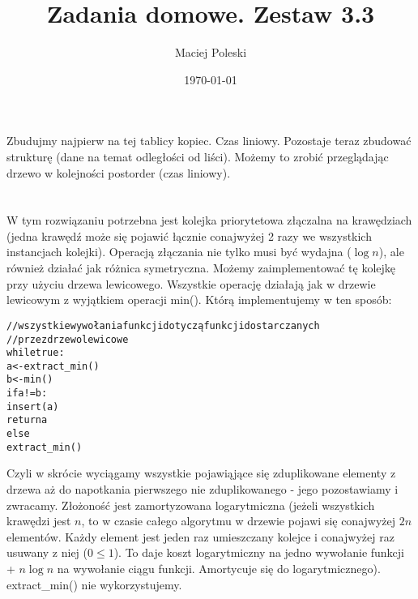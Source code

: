 \documentclass[a4paper,12pt]{article}
\title{Zadania domowe. Zestaw 3.3}
\author{Maciej Poleski}
\date{\today}
\begin{document}
\maketitle

\newpage

\section{}
Zbudujmy najpierw na tej tablicy kopiec. Czas liniowy. Pozostaje teraz zbudować strukturę (dane na temat odległości od liści). Możemy to zrobić przeglądając drzewo w kolejności postorder (czas liniowy).

\section{}
W tym rozwiązaniu potrzebna jest kolejka priorytetowa złączalna na krawędziach (jedna krawędź może się pojawić łącznie conajwyżej 2 razy we wszystkich instancjach kolejki). Operacją złączania nie tylko musi być wydajna ($\log{n}$), ale również działać jak różnica symetryczna. Możemy zaimplementować tę kolejkę przy użyciu drzewa lewicowego. Wszystkie operację działają jak w drzewie lewicowym z wyjątkiem operacji min(). Którą implementujemy w ten sposób:
\begin{alltt}
 // wszystkie wywołania funkcji dotyczą funkcji dostarczanych
 // przez drzewo lewicowe
 while true:
  a <- extract_min()
  b <- min()
  if a != b:
    insert(a)
    return a
  else
    extract_min()
\end{alltt}
Czyli w skrócie wyciągamy wszystkie pojawiąjące się zduplikowane elementy z drzewa aż do napotkania pierwszego nie zduplikowanego - jego pozostawiamy i zwracamy. Złożoność jest zamortyzowana logarytmiczna (jeżeli wszystkich krawędzi jest $n$, to w czasie całego algorytmu w drzewie pojawi się conajwyżej $2n$ elementów. Każdy element jest jeden raz umieszczany kolejce i conajwyżej raz usuwany z niej ($0\leq{1}$). To daje koszt logarytmiczny na jedno wywołanie funkcji + $n\log{n}$ na wywołanie ciągu funkcji. Amortycuje się do logarytmicznego).
extract\_min() nie wykorzystujemy.
\end{document}
